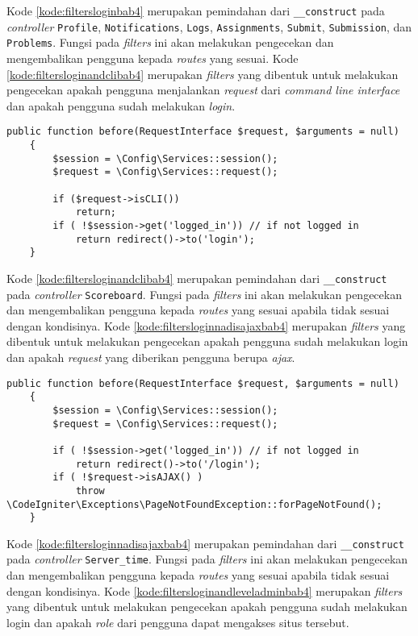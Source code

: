 Kode \ref{kode:filtersloginbab4} merupakan pemindahan dari \texttt{\_\_construct} pada \textit{controller} \texttt{Profile}, \texttt{Notifications}, \texttt{Logs}, \texttt{Assignments}, \texttt{Submit}, \texttt{Submission}, dan \texttt{Problems}. Fungsi pada \textit{filters} ini akan melakukan pengecekan dan mengembalikan pengguna kepada \textit{routes} yang sesuai. Kode \ref{kode:filtersloginandclibab4} merupakan \textit{filters} yang dibentuk untuk melakukan pengecekan apakah pengguna menjalankan \textit{request} dari \textit{command line interface} dan apakah pengguna sudah melakukan \textit{login}.

\begin{lstlisting}[caption=Pemindahan kode pada \textit{Filters}, label=kode:filtersloginandclibab4]
	public function before(RequestInterface $request, $arguments = null)
    {   
        $session = \Config\Services::session();
        $request = \Config\Services::request();

        if ($request->isCLI())
            return;
        if ( !$session->get('logged_in')) // if not logged in
            return redirect()->to('login');
    }
\end{lstlisting}

Kode \ref{kode:filtersloginandclibab4} merupakan pemindahan dari \texttt{\_\_construct} pada \textit{controller}  \texttt{Scoreboard}. Fungsi pada \textit{filters} ini akan melakukan pengecekan dan mengembalikan pengguna kepada \textit{routes} yang sesuai apabila tidak sesuai dengan kondisinya. Kode \ref{kode:filtersloginnadisajaxbab4} merupakan \textit{filters} yang dibentuk untuk melakukan pengecekan apakah pengguna sudah melakukan login dan apakah \textit{request} yang diberikan pengguna berupa \textit{ajax}.

\begin{lstlisting}[caption=Pemindahan kode pada \textit{Filters}, label=kode:filtersloginnadisajaxbab4]
	public function before(RequestInterface $request, $arguments = null)
    {   
        $session = \Config\Services::session();
        $request = \Config\Services::request();

		if ( !$session->get('logged_in')) // if not logged in
			return redirect()->to('/login');
        if ( !$request->isAJAX() )
			throw \CodeIgniter\Exceptions\PageNotFoundException::forPageNotFound();
    }
\end{lstlisting}

Kode \ref{kode:filtersloginnadisajaxbab4} merupakan pemindahan dari \texttt{\_\_construct} pada \textit{controller}  \texttt{Server\_time}. Fungsi pada \textit{filters} ini akan melakukan pengecekan dan mengembalikan pengguna kepada \textit{routes} yang sesuai apabila tidak sesuai dengan kondisinya. Kode \ref{kode:filtersloginandleveladminbab4} merupakan \textit{filters} yang dibentuk untuk melakukan pengecekan apakah pengguna sudah melakukan login dan apakah \textit{role} dari pengguna dapat mengakses situs tersebut.

